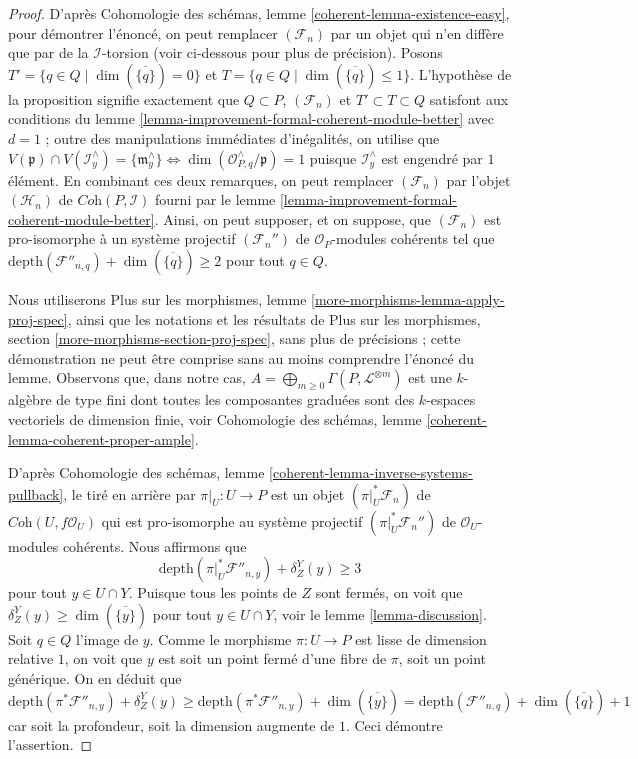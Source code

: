 \begin{proof}
D'après Cohomologie des schémas, lemme \ref{coherent-lemma-existence-easy},
pour démontrer l'énoncé, on peut remplacer $(\mathcal{F}_n)$ par un objet
qui n'en diffère que par de la $\mathcal{I}$-torsion (voir ci-dessous pour plus de précision).
Posons $T' = \{q \in Q \mid \dim(\overline{\{q\}}) = 0\}$
et $T = \{q \in Q \mid \dim(\overline{\{q\}}) \leq 1\}$.
L'hypothèse de la proposition signifie exactement que
$Q \subset P$, $(\mathcal{F}_n)$ et $T' \subset T \subset Q$
satisfont aux conditions du
lemme \ref{lemma-improvement-formal-coherent-module-better}
avec $d = 1$ ; outre des manipulations immédiates d'inégalités, on utilise que
$V(\mathfrak p) \cap V(\mathcal{I}^\wedge_y) = \{\mathfrak m^\wedge_y\}
\Leftrightarrow \dim(\mathcal{O}_{P, q}^\wedge/\mathfrak p) = 1$
puisque $\mathcal{I}_y^\wedge$ est engendré par $1$ élément.
En combinant ces deux remarques, on peut remplacer $(\mathcal{F}_n)$ par
l'objet $(\mathcal{H}_n)$ de $\textit{Coh}(P, \mathcal{I})$ fourni par le
lemme \ref{lemma-improvement-formal-coherent-module-better}.
Ainsi, on peut supposer, et on suppose, que $(\mathcal{F}_n)$ est pro-isomorphe à
un système projectif $(\mathcal{F}_n'')$ de $\mathcal{O}_P$-modules cohérents
tel que $\text{depth}(\mathcal{F}''_{n, q}) + \dim(\overline{\{q\}}) \geq 2$
pour tout $q \in Q$.

\medskip\noindent
Nous utiliserons Plus sur les morphismes, lemme \ref{more-morphisms-lemma-apply-proj-spec},
ainsi que les notations et les résultats de
Plus sur les morphismes, section \ref{more-morphisms-section-proj-spec},
sans plus de précisions ; cette démonstration ne peut être comprise sans
au moins comprendre l'énoncé du lemme.
Observons que, dans notre cas,
$A = \bigoplus_{m \geq 0} \Gamma(P, \mathcal{L}^{\otimes m})$
est une $k$-algèbre de type fini
dont toutes les composantes graduées sont des $k$-espaces vectoriels de dimension finie, voir
Cohomologie des schémas, lemme \ref{coherent-lemma-coherent-proper-ample}.

\medskip\noindent
D'après Cohomologie des schémas, lemme \ref{coherent-lemma-inverse-systems-pullback},
le tiré en arrière par $\pi|_U : U \to P$ est un objet
$(\pi|_U^*\mathcal{F}_n)$ de $\textit{Coh}(U, f\mathcal{O}_U)$
qui est pro-isomorphe au système projectif
$(\pi|_U^*\mathcal{F}_n'')$ de $\mathcal{O}_U$-modules cohérents.
Nous affirmons que
$$
\text{depth}(\pi|_U^*\mathcal{F}''_{n, y}) + \delta_Z^Y(y) \geq 3
$$
pour tout $y \in U \cap Y$. Puisque tous les points de $Z$ sont fermés, on
voit que $\delta_Z^Y(y) \geq \dim(\overline{\{y\}})$ pour tout
$y \in U \cap Y$, voir le lemme \ref{lemma-discussion}.
Soit $q \in Q$ l'image de $y$. Comme le morphisme $\pi : U \to P$ est
lisse de dimension relative $1$, on voit que $y$ est soit un point fermé
d'une fibre de $\pi$, soit un point générique.
On en déduit que
$$
\text{depth}(\pi^*\mathcal{F}''_{n, y}) + \delta_Z^Y(y)
\geq
\text{depth}(\pi^*\mathcal{F}''_{n, y}) + \dim(\overline{\{y\}}) =
\text{depth}(\mathcal{F}''_{n, q}) + \dim(\overline{\{q\}}) + 1
$$
car soit la profondeur, soit la dimension augmente de $1$.
Ceci démontre l'assertion.


\end{proof}
